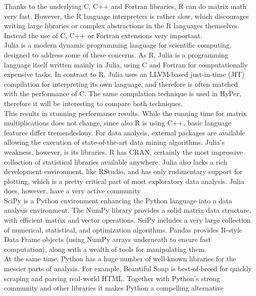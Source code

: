Thanks to the underlying C, C++ and Fortran libraries, R can do matrix math very fast. However, the R language interpreters is rather slow, which discourages writing large libraries or complex abstractions in the R languages themselves. Instead the use of C, C++ or Fortran extensions very important.
\\
Julia is a modern dynamic programming language for scientific computing, designed to address some of these concerns. As R, Julia is a programming language itself written mainly in Julia, using C and Fortran for computationally expensive tasks. In contrast to R, Julia uses an LLVM-based just-in-time (JIT) compilation for interpreting its own language, and therefore is often matched with the performance of C. The same compilation technique is used in HyPer, therefore it will be interesting to compare both techniques.
\\
This results in stunning performance results. While the running time for matrix multiplications does not change, since also R is using C++, basic language features differ tremendeslouy.
For data analysis, external packages are available allowing the execution of state-of-the-art data mining algorithms.
Julia’s weakness, however, is its libraries. R has CRAN, certainly the most impressive collection of statistical libraries available anywhere. Julia also lacks a rich development environment, like RStudio, and has only rudimentary support for plotting, which is a pretty critical part of most exploratory data analysis. Julia does, however, have a very active community
\\
SciPy is a Python environment enhancing the Python language into a data analysis environment. The NumPy library provides a solid matrix data structure, with efficient matrix and vector operations. 
SciPy includes a very large collection of numerical, statistical, and optimization algorithms.
Pandas provides R-style Data Frame objects (using NumPy arrays underneath to ensure fast computation), along with a wealth of tools for manipulating them.
\\
At the same time, Python has a huge number of well-known libraries for the messier parts of analysis. For example, Beautiful Soup is best-of-breed for quickly scraping and parsing real-world HTML. Together with Python’s strong community and other libraries it makes Python a compelling alternative


